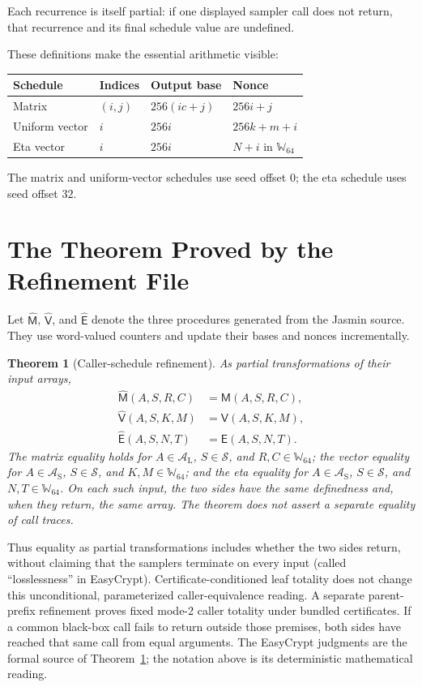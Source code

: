 \documentclass[11pt]{article}
\theoremstyle{definition}
\theoremstyle{plain}
\newtheorem{theorem}{Theorem}
\theoremstyle{remark}
\newcommand{\W}{\mathbb W_{64}}
\newcommand{\AL}{\mathcal A_{\mathrm L}}
\newcommand{\AS}{\mathcal A_{\mathrm S}}
\newcommand{\Seed}{\mathcal S}
\newcommand{\SchedMat}{\mathsf M}
\newcommand{\SchedVec}{\mathsf V}
\newcommand{\SchedEta}{\mathsf E}
\newcommand{\GenMat}{\widehat{\mathsf M}}
\newcommand{\GenVec}{\widehat{\mathsf V}}
\newcommand{\GenEta}{\widehat{\mathsf E}}
\begin{document}
Each recurrence is itself partial: if one displayed sampler call does not
return, that recurrence and its final schedule value are undefined.

These definitions make the essential arithmetic visible:
\begin{center}
\begin{tabular}{llll}
\toprule
Schedule & Indices & Output base & Nonce \\
\midrule
Matrix & $(i,j)$ & $256(ic+j)$ & $256i+j$ \\
Uniform vector & $i$ & $256i$ & $256k+m+i$ \\
Eta vector & $i$ & $256i$ & $N+i$ in $\W$ \\
\bottomrule
\end{tabular}
\end{center}
The matrix and uniform-vector schedules use seed offset $0$; the eta schedule
uses seed offset $32$.

\section{The Theorem Proved by the Refinement File}

Let $\GenMat$, $\GenVec$, and $\GenEta$ denote the three procedures generated
from the Jasmin source.  They use word-valued counters and update their bases
and nonces incrementally.

\begin{theorem}[Caller-schedule refinement]
\label{thm:main}
As partial transformations of their input arrays,
\begin{align*}
  \GenMat(A,S,R,C) &= \SchedMat(A,S,R,C),\\
  \GenVec(A,S,K,M) &= \SchedVec(A,S,K,M),\\
  \GenEta(A,S,N,T) &= \SchedEta(A,S,N,T).
\end{align*}
The matrix equality holds for $A\in\AL$, $S\in\Seed$, and $R,C\in\W$; the
vector equality for $A\in\AS$, $S\in\Seed$, and $K,M\in\W$; and the eta
equality for $A\in\AS$, $S\in\Seed$, and $N,T\in\W$.  On each such input, the
two sides have the same definedness and, when they return, the same array.  The
theorem does not assert a separate equality of call traces.
\end{theorem}

Thus equality as partial transformations includes whether the two sides
return, without claiming that the samplers terminate on every input (called
``losslessness'' in EasyCrypt).  Certificate-conditioned leaf totality does
not change this unconditional, parameterized caller-equivalence reading.  A
separate parent-prefix refinement proves fixed mode-2 caller totality under
bundled certificates.  If a common black-box call fails to return outside
those premises, both sides have reached that same call from equal arguments.
The EasyCrypt judgments are the formal source of
Theorem~\ref{thm:main}; the notation above is its deterministic mathematical
reading.
\end{document}
